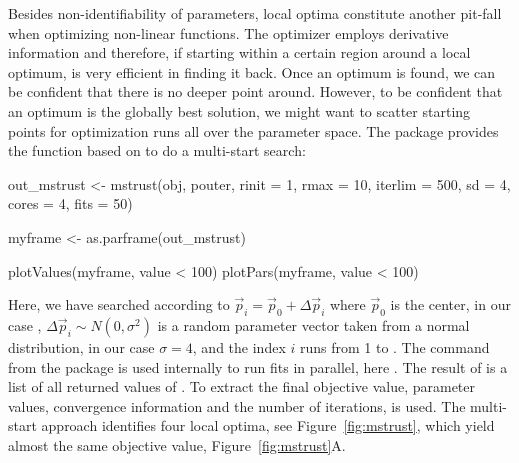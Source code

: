 \documentclass[article]{jss}
\begin{document}
Besides non-identifiability of parameters, local optima constitute another pit-fall when optimizing non-linear functions. The  optimizer employs derivative information and therefore, if starting within a certain region around a local optimum, is very efficient in finding it back. Once an optimum is found, we can be confident that there is no deeper point around. However, to be confident that an optimum is the globally best solution, we might want to scatter starting points for optimization runs all over the parameter space. The  package provides the  function based on  to do a multi-start search:
\begin{CodeChunk}
\begin{CodeInput}
out_mstrust <- mstrust(obj, pouter, rinit = 1, rmax = 10, iterlim = 500,
                       sd = 4,
                       cores = 4, fits = 50)

myframe <- as.parframe(out_mstrust)

plotValues(myframe, value < 100)
plotPars(myframe, value < 100)
\end{CodeInput}
\end{CodeChunk}
Here, we have searched according to $\vec p_i = \vec p_0 + \Delta\vec p_i$ where $\vec p_0$ is the center, in our case , $\Delta\vec p_i\sim N(0, \sigma^2)$ is a random parameter vector taken from a normal distribution, in our case $\sigma = 4$, and the index $i$ runs from 1 to . The  command from the  package is used internally to run fits in parallel, here . The result of  is a list of all returned values of . To extract the final objective value, parameter values, convergence information and the number of iterations,  is used. The multi-start approach identifies four local optima, see Figure~\ref{fig:mstrust}, which yield almost the same objective value, Figure~\ref{fig:mstrust}A.
\end{document}
